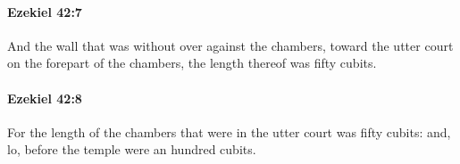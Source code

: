 		\paragraph{Ezekiel 42:7} %
			\label{EZEKIEL-42-7}

			And the wall that was without over against the chambers, toward the utter court on the forepart of the chambers, the length thereof was fifty cubits.


		\paragraph{Ezekiel 42:8} %
			\label{EZEKIEL-42-8}

			For the length of the chambers that were in the utter court was fifty cubits: and, lo, before the temple were an hundred cubits.


